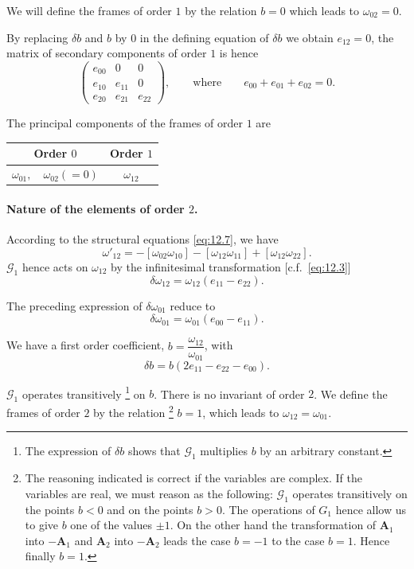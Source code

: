 \documentclass[leqno,11pt]{book}
\numberwithin{equation}{chapter}
\theoremstyle{shape1}
\theoremstyle{shapesmall}
\begin{document}
We will define the frames of order $1$ by the relation $b=0$ which leads to $\omega_{02}=0$.

By replacing $\delta b$ and $b$ by $0$ in the defining equation of $\delta b$ we obtain $e_{12}=0$, the matrix of secondary components of order $1$ is hence
\[
\begin{pmatrix}
  e_{00}&0&0\\
  e_{10}&e_{11}&0\\
  e_{20}&e_{21}&e_{22}
\end{pmatrix},
\qquad\text{where}\qquad e_{00}+e_{01}+e_{02}=0.
\]

The principal components of the frames of order $1$ are
\begin{center}  
\begin{tabular}{|c|c|}
  \hline
  Order $0$&Order $1$\\
  \hline
  $\omega_{01},\quad\omega_{02}(=0)$&$\omega_{12}$\\
  \hline
\end{tabular}
\end{center}


\paragraph{Nature of the elements of order $2$.}
\label{sec:176}
According to the structural equations \eqref{eq:12.7}, we have
\[
\omega'_{12}=-[\omega_{02}\omega_{10}]-[\omega_{12}\omega_{11}]+[\omega_{12}\omega_{22}].
\]
$\mathcal{G}_{1}$ hence acts on $\omega_{12}$ by the infinitesimal transformation [c.f.~\eqref{eq:12.3}]
\[
\delta\omega_{12}=\omega_{12}(e_{11}-e_{22}).
\]

The preceding expression of $\delta\omega_{01}$ reduce to
\[
\delta\omega_{01}=\omega_{01}(e_{00}-e_{11}).
\]

We have a first order coefficient, $b=\dfrac{\omega_{12}}{\omega_{01}}$, with
\[
\delta b=b(2e_{11}-e_{22}-e_{00}).
\]

$\mathcal{G}_{1}$ operates transitively \footnote{The expression of $\delta b$ shows that $\mathcal{G}_{1}$ multiplies $b$ by an arbitrary constant.} on $b$. There is no invariant of order $2$. We define the frames of order $2$ by the relation \footnote{The reasoning indicated is correct if the variables are complex. If the variables are real, we must reason as the following: $\mathcal{G}_{1}$ operates transitively on the points $b<0$ and on the points $b>0$. The operations of $G_{1}$ hence allow us to give $b$ one of the values $\pm 1$. On the other hand the transformation of $\mathbf{A}_{1}$ into $-\mathbf{A}_{1}$ and $\mathbf{A}_{2}$ into $-\mathbf{A}_{2}$ leads the case $b=-1$ to the case $b=1$. Hence finally $b=1$.} $b=1$, which leads to $\omega_{12}=\omega_{01}$.
\end{document}
